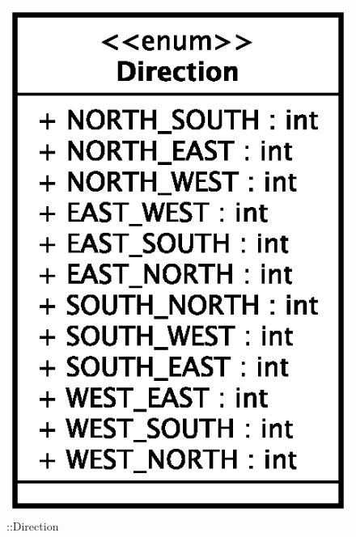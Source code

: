 \begin{figure}[h]
\centering
\includegraphics[scale=0.6,keepaspectratio]{images/solution/app/backend/direction.eps}
\caption{\pReactiveComponent::Direction}
\label{fig:sd-app-direction}
\end{figure}
\FloatBarrier
